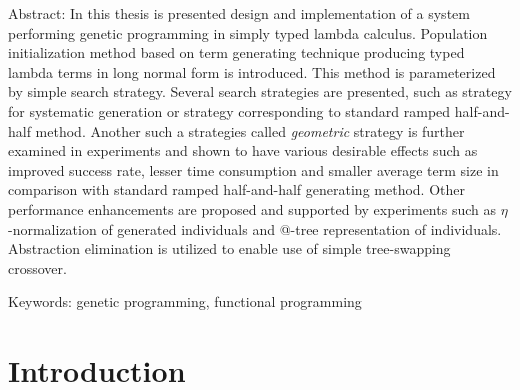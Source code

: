 \documentclass[12pt,a4paper]{report}
\begin{document}
{Abstract:
{\fontsize{0.35cm}{1em}\selectfont 
In this thesis is presented design and implementation
of a system performing genetic programming in simply
typed lambda calculus. Population initialization
method based on term generating technique producing
typed lambda terms in long normal form is introduced. 
This method is parameterized by simple search strategy.
Several search strategies are presented, such as
strategy for systematic generation or strategy
corresponding to standard ramped half-and-half method.
Another such a strategies called \textit{geometric} strategy
is further examined in experiments and shown
to have various desirable effects such as
improved success rate, lesser time consumption and 
smaller average term size in comparison with standard 
ramped half-and-half generating method. Other performance
enhancements are proposed and supported by experiments
such as $\eta$-normalization of generated individuals and 
@-tree representation of individuals. Abstraction elimination
is utilized to enable use of simple tree-swapping crossover.
}
  


Keywords:
genetic programming, functional programming

\vss}

\newpage



\pagestyle{plain}
\setcounter{page}{1}


\tableofcontents
	
\chapter*{Introduction}

\end{document}
